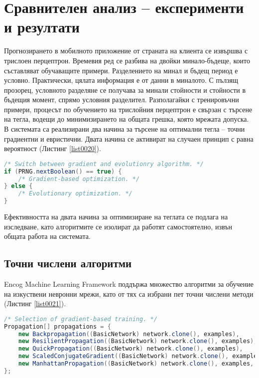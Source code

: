 ﻿\chapter{Сравнителен анализ – експерименти и резултати}

Прогнозирането в мобилното приложение от страната на клиента се извършва с трислоен перцептрон. Времевия ред се разбива на двойки минало-бъдеще, които съставляват обучаващите примери. Разделението на минал и бъдещ период е условно. Практически, цялата информация е от данни в миналото. С пълзящ прозорец, условното разделяне се получава за минали стойности и стойности в бъдещия момент, спрямо условния разделител. Разполагайки с тренировъчни примери, процесът по обучението на трислойния перцептрон е свързан с търсене на тегла, водещи до минимизирането на общата грешка, която мрежата допуска. В системата са реализирани два начина за търсене на оптимални тегла – точни градиентни и евристични. Двата начина се активират на случаен принцип с равна вероятност (Листинг \ref{list0020}).

\begin{lstlisting}[caption=Превключване на алгоритмите за обучение, language=Java, basicstyle=\tiny, label=list0020]
/* Switch between gradient and evolutionry algorithm. */
if (PRNG.nextBoolean() == true) {
	/* Gradient-based optimization. */
} else {
	/* Evolutionary optimization. */
}
\end{lstlisting}

Ефективността на двата начина за оптимизиране на теглата се подлага на изследване, като алгоритмите се изолират да работят самостоятелно, извън общата работа на системата. 

\section{Точни числени алгоритми}

Encog Machine Learning Framework поддържа множество алгоритми за обучение на изкуствени невронни мрежи, като от тях са избрани пет точни числени методи (Листинг \ref{list0021}).

\begin{lstlisting}[caption=Набор от точни числени методи, language=Java, basicstyle=\tiny, label=list0021]
/* Selection of gradient-based training. */
Propagation[] propagations = {
	new Backpropagation((BasicNetwork) network.clone(), examples),
	new ResilientPropagation((BasicNetwork) network.clone(), examples),
	new QuickPropagation((BasicNetwork) network.clone(), examples),
	new ScaledConjugateGradient((BasicNetwork) network.clone(), examples),
	new ManhattanPropagation((BasicNetwork) network.clone(), examples, PRNG.nextDouble())
};
\end{lstlisting}

